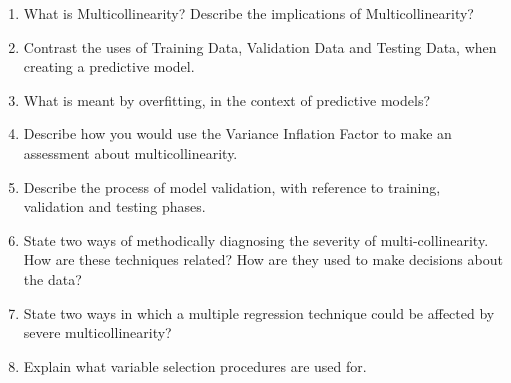 \documentclass[a4paper,12pt]{article}
\begin{document}
\begin{enumerate}
	
	\item What is Multicollinearity? Describe the implications of Multicollinearity?
	\item Contrast the uses of Training Data, Validation Data and Testing Data, when creating a predictive model.
	\item What is meant by overfitting, in the context of predictive models?
	\item Describe how you would use the Variance Inflation Factor to make an assessment about multicollinearity.
	
	\item Describe the process of model validation, with reference to training, validation and testing phases.
	\item State two ways of methodically diagnosing the severity of multi-collinearity. How are these techniques related? How are they used to make decisions about the data?
	\item State two ways in which a multiple regression technique could be affected by severe multicollinearity?
	\item Explain what variable selection procedures are used for.
	
\end{enumerate}
\end{document}
